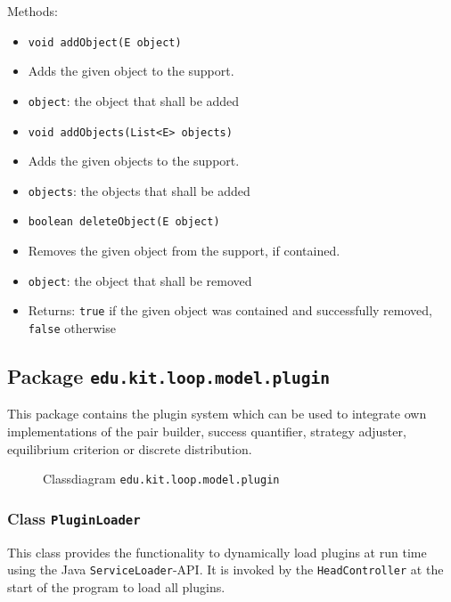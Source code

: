 \documentclass[parskip=full,11pt]{scrartcl}
\begin{document}
Methods:
\begin{itemize}\itemsep -10pt
\item \texttt{void addObject(E object)}
\item[] Adds the given object to the support.
\item[] \texttt{object}: the object that shall be added

\item \texttt{void addObjects(List<E> objects)}
\item[] Adds the given objects to the support.
\item[] \texttt{objects}: the objects that shall be added

\item \texttt{boolean deleteObject(E object)}
\item[] Removes the given object from the support, if contained.
\item[] \texttt{object}: the object that shall be removed
\item[] Returns: \texttt{true} if the given object was contained and successfully removed, \texttt{false} otherwise
\end{itemize}

\subsection{Package \texttt{edu.kit.loop.model.plugin}}

This package contains the plugin system which can be used to integrate own implementations of the pair builder, success quantifier, strategy adjuster, equilibrium criterion or discrete distribution.

\iftrue
\begin{figure}[h]
	\centering
	\fontsize{6.5}{8}\selectfont
	

	\caption{Classdiagram \texttt{edu.kit.loop.model.plugin}}
\end{figure}

\subsubsection{Class \texttt{PluginLoader}}

This class provides the functionality to dynamically load plugins at run time using the Java \texttt{ServiceLoader}-API. It is invoked by the \texttt{HeadController} at the start of the program to load all plugins.
\end{document}
